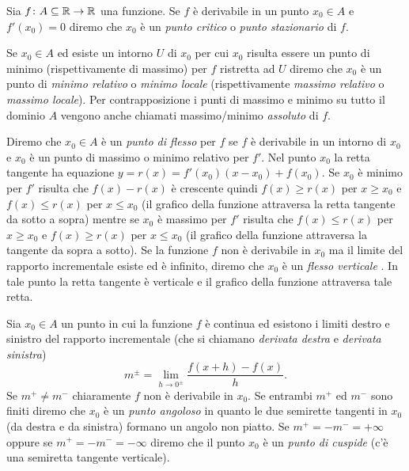 \begin{definition}
Sia $f\colon A \subseteq {\mathbb R} \to {\mathbb R}$ una funzione. Se $f$ è derivabile in un
punto $x_0\in A$ e $f'(x_0) = 0$ diremo che $x_0$ è un \emph{punto critico}%
%
o
\emph{punto stazionario}
di $f$.

Se $x_0\in A$ ed esiste un intorno $U$ di $x_0$ per cui $x_0$ risulta
essere un punto di minimo (rispettivamente di massimo) per $f$ ristretta ad $U$
diremo che $x_0$ è un punto di \emph{minimo relativo}%
%
 o \emph{minimo locale}
(rispettivamente \emph{massimo relativo} o \emph{massimo locale}).
Per contrapposizione i punti di massimo e minimo su tutto il dominio $A$
vengono anche
chiamati massimo/minimo \emph{assoluto} di $f$.

Diremo che $x_0\in A$ è un \emph{punto di flesso}%
%
 per $f$ se
$f$ è derivabile in un intorno di $x_0$ e $x_0$ è un punto di massimo
o minimo relativo per $f'$. Nel punto $x_0$ la retta tangente
ha equazione $y=r(x) = f'(x_0) (x-x_0) + f(x_0)$. Se $x_0$ è
minimo per $f'$ risulta che $f(x)-r(x)$ è crescente
quindi $f(x)\ge r(x)$ per $x\ge x_0$ e $f(x)\le r(x)$ per $x\le x_0$
(il grafico della funzione attraversa la retta tangente da sotto a sopra)
mentre se $x_0$ è massimo per $f'$ risulta che $f(x)\le r(x)$ per $x\ge x_0$
e $f(x) \ge r(x)$ per $x\le x_0$ (il grafico della funzione attraversa
la tangente da sopra a sotto).
Se la funzione $f$ non è derivabile in $x_0$ ma il limite del rapporto
incrementale esiste ed è infinito, diremo che $x_0$ è un
\emph{flesso verticale}%
%
. In tale punto la retta tangente è verticale
e il grafico della funzione attraversa tale retta.

Sia $x_0\in A$ un punto in cui la funzione $f$ è continua ed esistono
i limiti destro e sinistro del rapporto incrementale
(che si chiamano \emph{derivata destra} e \emph{derivata sinistra})
\[
  m^{\pm} = \lim_{h\to 0^\pm}\frac{f(x+h) - f(x)}{h}.
\]
Se $m^+ \neq m^-$ chiaramente $f$ non è derivabile in $x_0$.
Se entrambi $m^+$ ed $m^-$ sono finiti diremo che $x_0$ è un
\emph{punto angoloso}%
%
 in quanto le due semirette tangenti
in $x_0$ (da destra e da sinistra) formano un angolo non piatto.
Se $m^+=-m^-=+\infty$ oppure se $m^+=-m^-=-\infty$
diremo che il punto $x_0$ è un \emph{punto di cuspide}%
%
 (c'è una
semiretta tangente verticale).
\end{definition}

